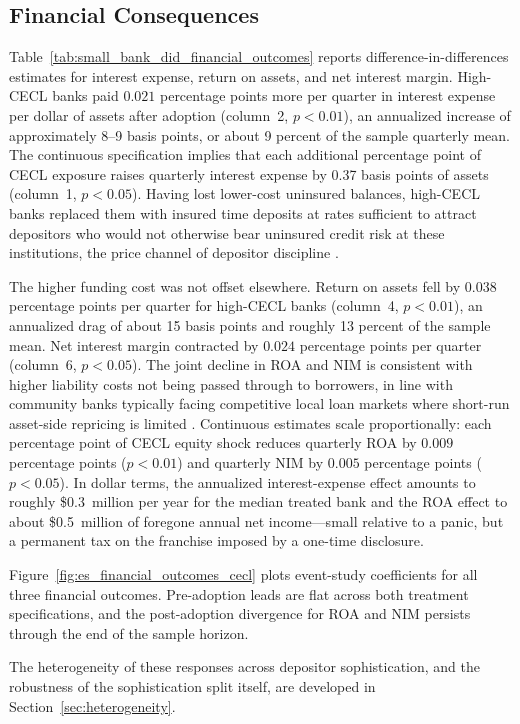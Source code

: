 \subsection{Financial Consequences}
\label{sec:results:financial}

Table~\ref{tab:small_bank_did_financial_outcomes} reports difference-in-differences
estimates for interest expense, return on assets, and net interest margin.
High-CECL banks paid $0.021$ percentage points more per quarter in interest
expense per dollar of assets after adoption (column~2, $p < 0.01$), an
annualized increase of approximately 8--9 basis points, or about 9 percent of
the sample quarterly mean.  The continuous specification implies that each
additional percentage point of CECL exposure raises quarterly interest expense
by 0.37 basis points of assets (column~1, $p < 0.05$).  Having lost lower-cost
uninsured balances, high-CECL banks replaced them with insured time deposits at
rates sufficient to attract depositors who would not otherwise bear uninsured
credit risk at these institutions, the price channel of depositor discipline
\citep{nier2006market, billett1998cost}.

The higher funding cost was not offset elsewhere.  Return on assets fell by
$0.038$ percentage points per quarter for high-CECL banks (column~4, $p < 0.01$),
an annualized drag of about 15 basis points and roughly 13 percent of the sample
mean.  Net interest margin contracted by $0.024$ percentage points per quarter
(column~6, $p < 0.05$).  The joint decline in ROA and NIM is consistent with
higher liability costs not being passed through to borrowers, in line with
community banks typically facing competitive local loan markets where
short-run asset-side repricing is limited \citep{hannan1988bank}.
Continuous estimates scale proportionally: each percentage point of CECL equity
shock reduces quarterly ROA by $0.009$ percentage points ($p < 0.01$) and
quarterly NIM by $0.005$ percentage points ($p < 0.05$).  In dollar terms, the
annualized interest-expense effect amounts to roughly \$0.3~million per year
for the median treated bank and the ROA effect to about \$0.5~million of
foregone annual net income---small relative to a panic, but a permanent tax
on the franchise imposed by a one-time disclosure.

Figure~\ref{fig:es_financial_outcomes_cecl} plots event-study coefficients for
all three financial outcomes.  Pre-adoption leads are flat across both treatment
specifications, and the post-adoption divergence for ROA and NIM persists through
the end of the sample horizon.

The heterogeneity of these responses across depositor sophistication, and the
robustness of the sophistication split itself, are developed in
Section~\ref{sec:heterogeneity}.

